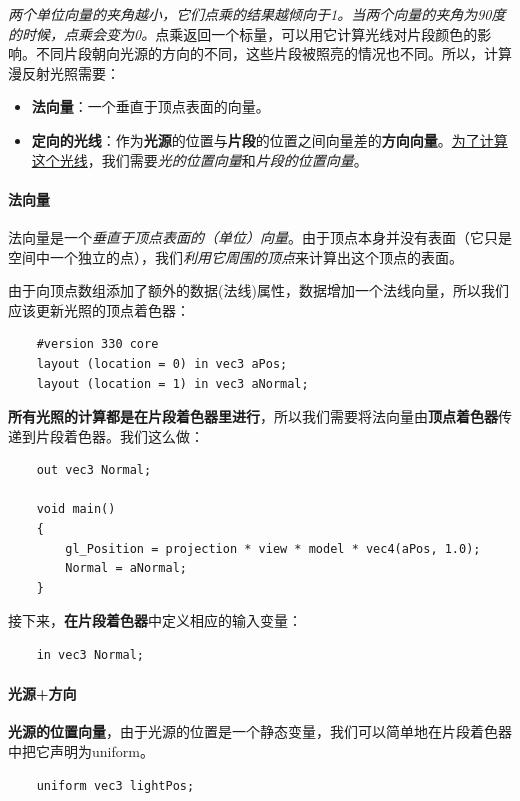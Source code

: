 \documentclass[UTF8,a4paper,12pt]{ctexbook}
\begin{document}
			\textit{两个单位向量的夹角越小，它们点乘的结果越倾向于1。当两个向量的夹角为90度的时候，点乘会变为0。}点乘返回一个标量，可以用它计算光线对片段颜色的影响。不同片段朝向光源的方向的不同，这些片段被照亮的情况也不同。所以，计算漫反射光照需要：
			
			\begin{itemize}
				\item \textbf{法向量}：一个垂直于顶点表面的向量。
				\item \textbf{定向的光线}：作为\textbf{光源}的位置与\textbf{片段}的位置之间向量差的\textbf{方向向量}。\underline{为了计算这个光线}，我们需要\textit{光的位置向量}和\textit{片段的位置向量}。
			\end{itemize}
			
			
			\paragraph{法向量}
				法向量是一个\textit{垂直于顶点表面的（单位）向量}。由于顶点本身并没有表面（它只是空间中一个独立的点），我们\textit{利用它周围的顶点}来计算出这个顶点的表面。
				
				由于向顶点数组添加了额外的数据(法线)属性，数据增加一个法线向量，所以我们应该更新光照的顶点着色器：
				\begin{lstlisting}
	#version 330 core
	layout (location = 0) in vec3 aPos;
	layout (location = 1) in vec3 aNormal;				
				\end{lstlisting}
				
				\textbf{所有光照的计算都是在片段着色器里进行}，所以我们需要将法向量由\textbf{顶点着色器}传递到片段着色器。我们这么做：
				\begin{lstlisting}
	out vec3 Normal;
	
	void main()
	{
	    gl_Position = projection * view * model * vec4(aPos, 1.0);
	    Normal = aNormal;
	}					
				\end{lstlisting}
				
				接下来，\textbf{在片段着色器}中定义相应的输入变量：
				\begin{lstlisting}
	in vec3 Normal;			
				\end{lstlisting}
			
			
			\paragraph{光源+方向}
				\textbf{光源的位置向量}，由于光源的位置是一个静态变量，我们可以简单地在片段着色器中把它声明为uniform。
				
				\begin{lstlisting}
	uniform vec3 lightPos;				
				\end{lstlisting}
				
\end{document}
